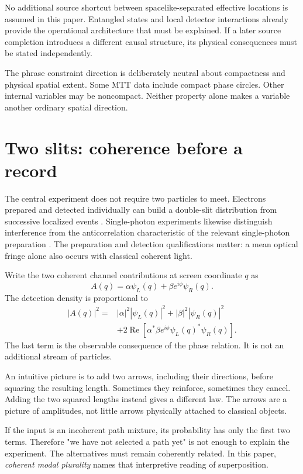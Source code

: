 \documentclass[11pt,a4paper]{article}
\begin{document}
No additional source shortcut between spacelike-separated effective locations is assumed in this paper. Entangled states and local detector interactions already provide the operational architecture that must be explained. If a later source completion introduces a different causal structure, its physical consequences must be stated independently.

The phrase constraint direction is deliberately neutral about compactness and physical spatial extent. Some MTT data include compact phase circles. Other internal variables may be noncompact. Neither property alone makes a variable another ordinary spatial direction.

\section{Two slits: coherence before a record}
\label{sec:slits}
The central experiment does not require two particles to meet. Electrons prepared and detected individually can build a double-slit distribution from successive localized events \cite{Bach}. Single-photon experiments likewise distinguish interference from the anticorrelation characteristic of the relevant single-photon preparation \cite{Grangier}. The preparation and detection qualifications matter: a mean optical fringe alone also occurs with classical coherent light.

Write the two coherent channel contributions at screen coordinate \(q\) as
\begin{equation}
A(q)=\alpha\psi_L(q)+\beta e^{i\phi}\psi_R(q).
\end{equation}
The detection density is proportional to
\begin{align}
|A(q)|^2={}&|\alpha|^2|\psi_L(q)|^2+
|\beta|^2|\psi_R(q)|^2 \nonumber\\
&+2\operatorname{Re}\!\left[
\alpha^*\beta e^{i\phi}\psi_L(q)^*\psi_R(q)\right].
\label{eq:interference}
\end{align}
The last term is the observable consequence of the phase relation. It is not an additional stream of particles.

An intuitive picture is to add two arrows, including their directions, before squaring the resulting length. Sometimes they reinforce, sometimes they cancel. Adding the two squared lengths instead gives a different law. The arrows are a picture of amplitudes, not little arrows physically attached to classical objects.

If the input is an incoherent path mixture, its probability has only the first two terms. Therefore "we have not selected a path yet" is not enough to explain the experiment. The alternatives must remain coherently related. In this paper, \emph{coherent modal plurality} names that interpretive reading of superposition.
\end{document}
